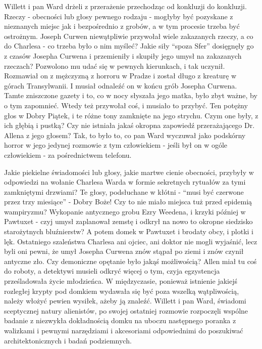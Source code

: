 Willett i  pan Ward drżeli z przerażenie przechodząc od konkluzji do konkluzji. Rzeczy - obecności lub głosy pewnego rodzaju - mogłyby być pozyskane z nieznanych miejsc jak i bezpośrednio z grobów, a w tym procesie trzeba być ostrożnym. Joseph Curwen niewątpliwie przywołał wiele zakazanych rzeczy, a co do Charlesa - co trzeba było o nim myśleć? Jakie siły ``spoza Sfer'' dosięgnęły go z czasów Josepha Curwena i przemieniły i skupiły jego umysł na zakazanych rzeczach? Pozwolono mu udać się w pewnych kierunkach, i tak uczynił. Rozmawiał on z mężczyzną z horroru w Pradze i został długo z kreaturę w górach Transylwanii. I musiał odnaleźć on w końcu grób Josepha Curwena. Tamte zniszczone gazety i to, co w nocy słyszała jego matka, było zbyt ważne, by o tym zapomnieć. Wtedy też przywołał coś, i musiało to przybyć. Ten potężny głos w Dobry Piątek, i te różne tony zamknięte na jego strychu. Czym one były, z ich głębią i pustką? Czy nie istniała jakaś okropna zapowiedź przerażającego Dr. Allena z jego głosem? Tak, to było to, co pan Ward wyczuwał jako podskórny horror w jego jedynej rozmowie z tym człowiekiem - jeśli był on w ogóle człowiekiem - za pośrednictwem telefonu.

Jakie piekielne świadomości lub głosy, jakie martwe cienie obecności, przybyły w odpowiedzi na wołanie Charlesa Warda w formie sekretnych rytuałów za tymi zamkniętymi drzwiami? Te głosy, podsłuchane w kłótni - ``musi być czerwone przez trzy miesiące'' - Dobry Boże! Czy to nie miało miejsca tuż przed epidemią wampiryzmu? Wykopanie antycznego grobu Ezry Weedena, i krzyki później w Pawtuxet - czyj umysł zaplanował zemstę i odkrył na nowo to okropne siedzisko starożytnych bluźnierstw? A potem domek w Pawtuxet i brodaty obcy, i plotki i lęk. Ostatniego szaleństwa Charlesa ani ojciec, ani doktor nie mogli wyjaśnić, lecz byli oni pewni, że umył Josepha Curwena znów stąpał po ziemi i znów czynił antyczne zło. Czy demoniczne opętanie było jakąś możliwością? Allen miał tu coś do roboty, a detektywi musieli odkryć więcej o tym, czyja egzystencja prześladowała życie młodzieńca. W międzyczasie, ponieważ istnienie jakiejś rozległej krypty pod domkiem wydawała się być poza wszelką wątpliwością, należy włożyć pewien wysiłek, ażeby ją znaleźć. Willett i pan Ward, świadomi sceptycznej natury alienistów, po swojej ostatniej rozmowie rozpoczęli wspólne badanie z niezwykła dokładnością domku na uboczu następnego poranka z walizkami i pewnymi narzędziami i akcesoriami odpowiednimi do poszukiwać architektonicznych i badań podziemnych. 

